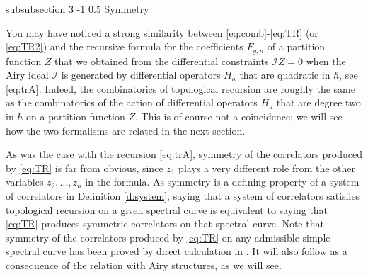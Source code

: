 \documentclass[reqno,oneside,11pt]{amsart}
\makeatletter
\theoremstyle{plain}
\theoremstyle{definition}
\theoremstyle{remark}
\newtheorem{remark}[theorem]{Remark}
\numberwithin{equation}{section}
\renewcommand{\subsubsection}{\@startsection
{subsubsection}%
{3}%
{\z@}%
{-1\baselineskip}%
{0.5\baselineskip}%
{\normalfont \it \normalsize}} %
\newcommand{\I}{\mathcal{I}}
\newcommand{\Ra}{\text{Ram}}
\makeatother
\begin{document}
%

\subsubsection{Symmetry}

You may have noticed a strong similarity between \eqref{eq:comb}-\eqref{eq:TR} (or \eqref{eq:TR2}) and the recursive formula for the coefficients $F_{g,n}$ of a partition function $Z$ that we obtained from the differential constraints $\I Z = 0$ when the Airy ideal $\I$ is generated by differential operators $H_a$ that are quadratic in $\hbar$, see \eqref{eq:trA}.  Indeed, the combinatorics of topological recursion are roughly the same as the combinatorics of the action of differential operators $H_a$ that are degree two in $\hbar$  on a partition function $Z$. This is of course not a coincidence; we will see how the two formalisms are related in the next section.

As was the case with the recursion \eqref{eq:trA}, symmetry of the correlators produced by \eqref{eq:TR} is far from obvious, since $z_1$ plays a very different role from the other variables $z_2, \ldots, z_n$ in the formula. As symmetry is a defining property of a system of correlators in Definition \ref{d:system}, saying that a system of correlators satisfies topological recursion on a given spectral curve is equivalent to saying that \eqref{eq:TR} produces symmetric correlators on that spectral curve. Note that symmetry of the correlators produced by \eqref{eq:TR} on any admissible simple spectral curve has been proved by direct calculation in \cite{EO07}. It will also follow as a consequence of the relation with Airy structures, as we will see.
\end{document}

